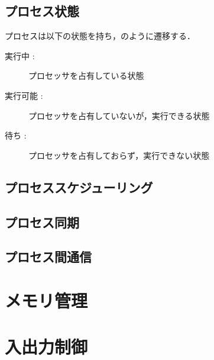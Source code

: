 \subsection{プロセス状態}

プロセスは以下の状態を持ち，のように遷移する．

\begin{description}
    \item[実行中 :] プロセッサを占有している状態
    \item[実行可能 :] プロセッサを占有していないが，実行できる状態
    \item[待ち :] プロセッサを占有しておらず，実行できない状態
\end{description}




\subsection{プロセススケジューリング}

\subsection{プロセス同期}

\subsection{プロセス間通信}



\section{メモリ管理}

\section{入出力制御}

